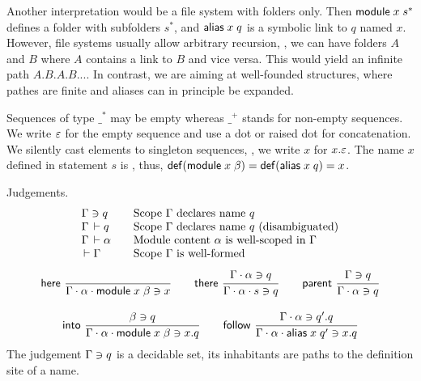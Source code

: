\documentclass{article}
\theoremstyle{definition}
\theoremstyle{plain}
\theoremstyle{remark}
\begin{document}
Another interpretation would be a file system with folders only.  Then
$\mathsf{module}\;x\;s^*$ defines a folder with subfolders $s^*$, and $\mathsf{alias}\;x\;q$ is a symbolic link to $q$ named $x$.  However, file systems usually
allow arbitrary recursion, \eg, we can have folders $A$ and $B$ where
$A$ contains a link to $B$ and vice versa.  This would yield an
infinite path $A.B.A.B...$. In contrast, we are aiming
at well-founded structures, where pathes are finite and
aliases can in principle be expanded.

Sequences of type $\_^*$ may be empty whereas $\_^+$ stands for
non-empty sequences.
We write $\varepsilon$ for the empty sequence and use a dot or raised dot
for concatenation.
We silently cast elements to singleton sequences, \eg,
we write $x$ for $x.\varepsilon$.
The name $x$ defined in statement $s$ is , thus,
$\mathop{\mathsf{def}}(\mathsf{module}\;x\;\beta) = \mathop{\mathsf{def}}(\mathsf{alias}\;x\;q) = x$.

Judgements.
\[
\begin{array}{l@{\qquad}l}
  \Contains \Gamma q & \mbox{Scope $\Gamma$ declares name $q$} \\
  \Declares \Gamma q & \mbox{Scope $\Gamma$ declares name $q$ (disambiguated)} \\
  \WContent \Gamma \alpha & \mbox{Module content $\alpha$ is well-scoped in $\Gamma$}\\
  \WScope \Gamma & \mbox{Scope $\Gamma$ is well-formed}
\end{array}
\]
\begin{gather*}
  \nru{\rhere
     }{
     }{\Contains {\Gamma \sep \alpha \sep \mdef x \beta} x}
\qquad
   \nru{\rthere
      }{\Contains {\Gamma \sep \alpha} q
      }{\Contains {\Gamma \sep \alpha \sep s} q}
\qquad
   \nru{\rparent
      }{\Contains {\Gamma} q
      }{\Contains {\Gamma \sep \alpha} q}
\\[2ex]
  \nru{\rinto
     }{\Contains \beta q
     }{\Contains {\Gamma \sep \alpha \sep \mdef x \beta} {x.q}}
\qquad
  \nru{\rfollow
     }{\Contains {\Gamma \sep \alpha} {q'.q}
     }{\Contains {\Gamma \sep \alpha \sep \malias x q'} {x.q}}
\end{gather*}
The judgement $\Gamma\ni q$ is a decidable set, its inhabitants
are paths to the definition site of a name.
\end{document}
